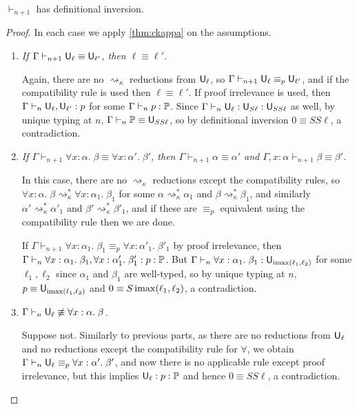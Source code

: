 \begin{theorem}\label{thm:1dinv}
$\vdash_{n+1}$ has definitional inversion.
\end{theorem}
\begin{proof}
In each case we apply \autoref{thm:ckappa} on the assumptions.
\begin{enumerate}
\item \emph{If $\Gamma\vdash_{n+1} \U_\ell\equiv\U_{\ell'}$, then $\ell\equiv\ell'$.}

Again, there are no $\rightsquigarrow_\kappa$ reductions from $\mathsf{U}_\ell$, so $\Gamma\vdash_{n+1} \U_\ell\equiv_p\U_{\ell'}$, and if the compatibility rule is used then $\ell\equiv\ell'$. If proof irrelevance is used, then $\Gamma\vdash_n\U_\ell,\U_{\ell'}:p$ for some $\Gamma\vdash_n p:\P$. Since $\Gamma\vdash_n\U_\ell:\U_{S\ell}:\U_{SS\ell}$ as well, by unique typing at $n$, $\Gamma\vdash_n \P\equiv \U_{SS\ell}$, so by definitional inversion $0\equiv SS\ell$, a contradiction.

\item \emph{If $\Gamma\vdash_{n+1} \forall x:\alpha.\;\beta\equiv\forall x:\alpha'.\;\beta'$, then $\Gamma\vdash_{n+1} \alpha\equiv\alpha'$ and $\Gamma,x:\alpha\vdash_{n+1} \beta\equiv \beta'$.}

In this case, there are no $\rightsquigarrow_\kappa$ reductions except the compatibility rules, so $\forall x:\alpha.\;\beta\rightsquigarrow_\kappa^*\forall x:\alpha_1.\;\beta_1$ for some $\alpha\rightsquigarrow_\kappa^*\alpha_1$ and $\beta\rightsquigarrow_\kappa^*\beta_1$, and similarly $\alpha'\rightsquigarrow_\kappa^*\alpha'_1$ and $\beta'\rightsquigarrow_\kappa^*\beta'_1$, and if these are $\equiv_p$ equivalent using the compatibility rule then we are done.

If $\Gamma\vdash_{n+1}\forall x:\alpha_1.\;\beta_1\equiv_p\forall x:\alpha'_1.\;\beta'_1$ by proof irrelevance, then $\Gamma\vdash_n\forall x:\alpha_1.\;\beta_1,\forall x:\alpha'_1.\;\beta'_1:p:\P$. But $\Gamma\vdash_n\forall x:\alpha_1.\;\beta_1:\U_{\imax(\ell_1,\ell_2)}$ for some $\ell_1,\ell_2$ since $\alpha_1$ and $\beta_1$ are well-typed, so by unique typing at $n$, $p\equiv\mathsf{U}_{\operatorname{imax}(\ell_1,\ell_2)}$ and $0\equiv S\operatorname{imax}(\ell_1,\ell_2)$, a contradiction.

\item \emph{$\Gamma\vdash_n \U_\ell\not\equiv\forall x:\alpha.\;\beta$.}

Suppose not. Similarly to previous parts, as there are no reductions from $\mathsf{U}_\ell$ and no reductions except the compatibility rule for $\forall$, we obtain $\Gamma\vdash_n\U_\ell\equiv_p\forall x:\alpha'.\;\beta'$, and now there is no applicable rule except proof irrelevance, but this implies $\mathsf{U}_\ell:p:\mathbb{P}$ and hence $0\equiv SS\ell$, a contradiction.
\end{enumerate}
\end{proof}

